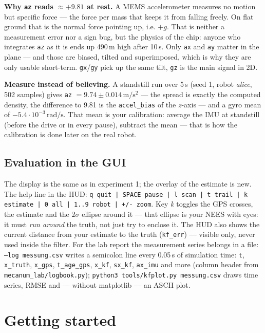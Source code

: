 \documentclass[12pt,a4paper]{scrartcl}
\newcommand{\thema}[1]{\texttt{#1}}
\newcommand{\ordner}[1]{\texttt{#1}}
\newcommand{\kommando}[1]{\texttt{#1}}
\begin{document}
\textbf{Why \thema{az} reads \(\approx +9.81\) at rest.} A MEMS accelerometer measures no
motion but specific force — the force per mass that keeps it from falling freely. On flat
ground that is the normal force pointing up, i.e. \(+g\). That is neither a measurement
error nor a sign bug, but the physics of the chip: anyone who integrates \thema{az} as it is
ends up 490\,m high after 10\,s. Only \thema{ax} and \thema{ay} matter in the plane — and
those are biased, tilted and superimposed, which is why they are only usable short-term.
\thema{gx}/\thema{gy} pick up the same tilt, \thema{gz} is the main signal in 2D.

\textbf{Measure instead of believing.} A standstill run over 5\,s (seed 1, robot
\emph{alice}, 502 samples) gives \thema{az} \(=9.74\pm0.014\,\mathrm{m/s^2}\) — the spread is
exactly the computed density, the difference to 9.81 is the \thema{accel\_bias} of the
\(z\)-axis — and a gyro mean of \(-5.4\cdot10^{-3}\,\mathrm{rad/s}\). That mean is your
calibration: average the IMU at standstill (before the drive or in every pause), subtract
the mean — that is how the calibration is done later on the real robot.

\subsection{Evaluation in the GUI}
The display is the same as in experiment 1; the overlay of the estimate is new.
The help line in the HUD: \kommando{q quit | SPACE pause | l scan | t trail | k estimate |
0 all | 1..9 robot | +/- zoom}. Key \emph{k} toggles the GPS crosses, the estimate and the
\(2\sigma\) ellipse around it — that ellipse is your NEES with eyes: it must
\emph{run around} the truth, not just try to enclose it. The HUD also shows the current
distance from your estimate to the truth (\texttt{kf\_err}) — visible only, never used
inside the filter. For the lab report the measurement series belongs in a file:
\kommando{--log messung.csv} writes a semicolon line every 0.05\,s of simulation time:
\thema{t}, \thema{x\_truth}, \thema{x\_gps}, \thema{t\_age\_gps}, \thema{x\_kf},
\thema{sx\_kf}, \thema{ax\_imu} and more (column header from \ordner{mecanum\_lab/logbook.py});
\kommando{python3 tools/kfplot.py messung.csv} draws time series, RMSE and —
without matplotlib — an ASCII plot.

\section{Getting started}\label{sec:inbetriebnahme}
\end{document}
